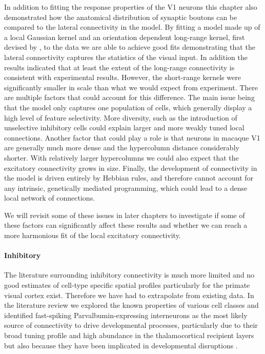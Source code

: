 In addition to fitting the response properties of the V1 neurons this
chapter also demonstrated how the anatomical distribution of synaptic
boutons can be compared to the lateral connectivity in the model. By
fitting a model made up of a local Gaussian kernel and an orientation
dependent long-range kernel, first devised by \cite{Buzas2006}, to the
data we are able to achieve good fits demonstrating that the lateral
connectivity captures the statistics of the visual input. In addition
the results indicated that at least the extent of the long-range
connectivity is consistent with experimental results. However, the
short-range kernels were significantly smaller in scale than what we
would expect from experiment. There are multiple factors that could
account for this difference. The main issue being that the model only
captures one population of cells, which generally display a high level
of feature selectivity. More diversity, such as the introduction of
unselective inhibitory cells could explain larger and more weakly
tuned local connections. Another factor that could play a role is that
neurons in macaque V1 are generally much more dense and the
hypercolumn distance considerably shorter. With relatively larger
hypercolumns we could also expect that the excitatory connectivity
grows in size. Finally, the development of connectivity in the model
is driven entirely by Hebbian rules, and therefore cannot account for
any intrinsic, genetically mediated programming, which could lead to a
dense local network of connections.

We will revisit some of these issues in later chapters to investigate
if some of these factors can significantly affect these results and
whether we can reach a more harmonious fit of the local excitatory
connectivity.

\paragraph{Inhibitory}

The literature surrounding inhibitory connectivity is much more
limited and no good estimates of cell-type specific spatial profiles
particularly for the primate visual cortex exist. Therefore we have
had to extrapolate from existing data. In the literature review we
explored the known properties of various cell classes and identified
fast-spiking Parvalbumin-expressing interneurons as the most likely
source of connectivity to drive developmental processes, particularly
due to their broad tuning profile
\citep{Albus1994,Kisvarday1997a,Hofer2011,Ma2011} and high abundance
in the thalamocortical recipient layers
\citep{VanBrederode1990,Hogan1992,Huxlin2001} but also because they
have been implicated in developmental disruptions
\citep{Fagiolini2004,Hensch2004}.

